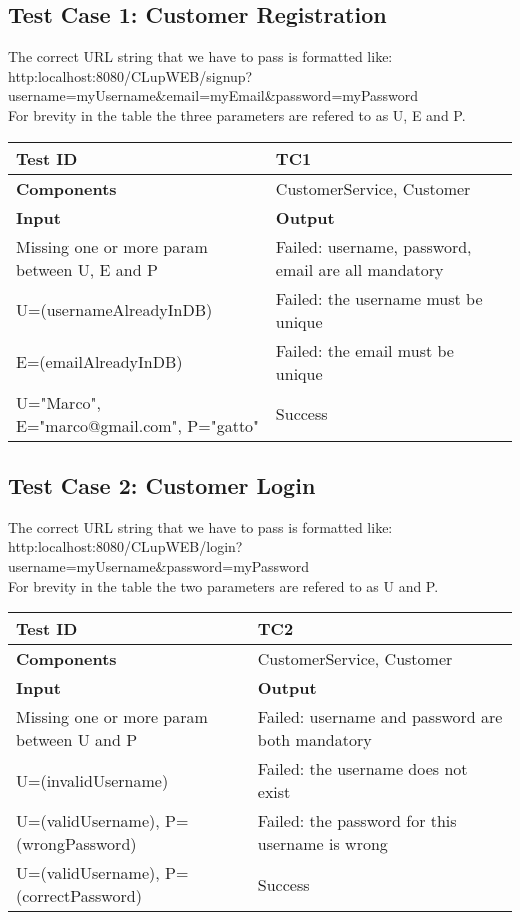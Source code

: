 \subsection{Test Case 1: Customer Registration}
The correct URL string that we have to pass is formatted like: \\
{\footnotesize http:localhost:8080/CLupWEB/signup?username=myUsername\&email=myEmail\&password=myPassword } \\
For brevity in the table the three parameters are refered to as U, E and P.
\begin{center}
    \begin{tabular}{ |  p{8cm} | p{8cm} |}
    \hline
     \textbf{Test ID}  & TC1 \\ \hline
     \textbf{Components}  & CustomerService, Customer\\ \hline
    \textbf{Input} & \textbf{Output}  \\ \hline
    Missing one or more param between U, E and P & Failed: username, password, email are all mandatory   \\ \hline
    U=(usernameAlreadyInDB) & Failed: the username must be unique \\ \hline
    E=(emailAlreadyInDB) & Failed: the email must be unique \\ \hline
    U="Marco", E="marco@gmail.com", P="gatto"  & Success 	   \\ \hline
    \end{tabular}
\end{center}



\subsection{Test Case 2: Customer Login}
The correct URL string that we have to pass is formatted like: \\
http:localhost:8080/CLupWEB/login?username=myUsername\&password=myPassword \\
For brevity in the table the two parameters are refered to as U and P.
\begin{center}
    \begin{tabular}{ |  p{8cm} | p{8cm} |}
    \hline
     \textbf{Test ID}  & TC2 \\ \hline
     \textbf{Components}  & CustomerService, Customer\\ \hline
    \textbf{Input} & \textbf{Output}  \\ \hline
    Missing one or more param between U and P & Failed: username and password are both mandatory   \\ \hline
    U=(invalidUsername) & Failed: the username does not exist \\ \hline
    U=(validUsername), P=(wrongPassword) & Failed: the password for this username is wrong \\ \hline
    U=(validUsername), P=(correctPassword) & Success 	   \\ \hline
    \end{tabular}
\end{center}




